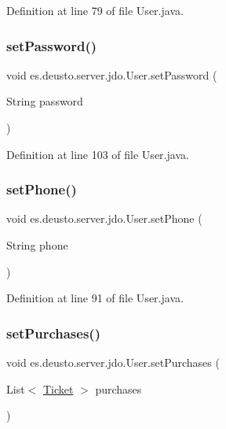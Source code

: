 Definition at line 79 of file User.\+java.

\mbox{\label{classes_1_1deusto_1_1server_1_1jdo_1_1_user_a2e052b5a7cab949f61580edf44bbd233}} 
\subsubsection{\texorpdfstring{setPassword()}{setPassword()}}
{\footnotesize\ttfamily void es.\+deusto.\+server.\+jdo.\+User.\+set\+Password (\begin{DoxyParamCaption}\item[{String}]{password }\end{DoxyParamCaption})}



Definition at line 103 of file User.\+java.

\mbox{\label{classes_1_1deusto_1_1server_1_1jdo_1_1_user_a2c330811de99729fb430ffe41be0540a}} 
\subsubsection{\texorpdfstring{setPhone()}{setPhone()}}
{\footnotesize\ttfamily void es.\+deusto.\+server.\+jdo.\+User.\+set\+Phone (\begin{DoxyParamCaption}\item[{String}]{phone }\end{DoxyParamCaption})}



Definition at line 91 of file User.\+java.

\mbox{\label{classes_1_1deusto_1_1server_1_1jdo_1_1_user_a37a375d73be22f96c8fdb5bb69239cfa}} 
\subsubsection{\texorpdfstring{setPurchases()}{setPurchases()}}
{\footnotesize\ttfamily void es.\+deusto.\+server.\+jdo.\+User.\+set\+Purchases (\begin{DoxyParamCaption}\item[{List$<$ \mbox{\hyperlink{classes_1_1deusto_1_1server_1_1jdo_1_1_ticket}{Ticket}} $>$}]{purchases }\end{DoxyParamCaption})}



